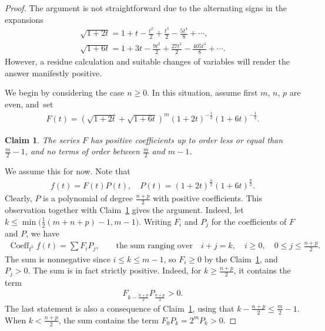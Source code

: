 \documentclass[pdftex]{sigma}
\numberwithin{equation}{section}
\newtheorem{Claim}[Theorem]{Claim}
\begin{document}
\begin{proof}
The argument is not straightforward due to the alternating signs
in the expansions
\begin{gather*}
\sqrt{1+2t}= 1+t - \frac{t^2}{2}+\frac{t^3}{2}-\frac{5t^4}{8}+\cdots,
\\
\sqrt{1+6t}=1 + 3t - \frac{9t^2}{2}+\frac{27t^3}{2} - \frac{405 t^4}{8} +\cdots.
\end{gather*}
However, a residue calculation and suitable changes of variables will render the answer manifestly positive.

We begin by considering the case $n\geq 0$. In this situation, assume first $m$, $n$, $p$ are even, and~set
\begin{gather*}
F(t)=\left(\sqrt{1+2t}+\sqrt{1+6t}\right)^m {(1+2t)}^{-\frac{1}{2}} (1+6t)^{-\frac{1}{2}}.
\end{gather*}

\begin{Claim}\label{claim}
The series $F$ has positive coefficients up to order less or equal than $\frac{m}{2}-1$, and no terms of order between $\frac{m}{2}$ and $m-1$.
\end{Claim}


We assume this for now. Note that
\begin{gather*}
f(t)=F(t) P(t), \quad P(t)=(1+2t)^{\frac{n}{2}} (1+6t)^{\frac{p}{2}}.
\end{gather*}
Clearly, $P$ is a polynomial of degree $\frac{n+p}{2}$ with positive coefficients. This observation together with Claim~\ref{claim} gives the argument. Indeed, let $k\leq \min\big(\frac{1}{2}(m+n+p)-1, m-1\big)$. Writing $F_i$ and $P_j$ for the coefficients of $F$ and $P$, we have
\begin{gather*}
\operatorname{Coeff}_{ t^k} f(t)=\sum F_iP_j, \qquad\text{the sum ranging over}\quad i+j=k, \quad i\geq 0,\quad 0\leq j\leq \frac{n+p}{2}.
\end{gather*}
The sum is nonnegative since $i\leq k\leq m-1$, so $F_i\geq 0$ by the Claim~\ref{claim}, and $P_j> 0$. The sum is in fact strictly positive. Indeed, for $k\geq \frac{n+p}{2}$, it contains the term
\begin{gather*}
F_{k-\frac{n+p}{2}} P_{\frac{n+p}{2}}>0.
\end{gather*}
The last statement is also a consequence of Claim~\ref{claim}, using that $k-\frac{n+p}{2}\leq\frac{m}{2}-1$. When $k<\frac{n+p}{2}$, the sum contains the term $F_0 P_k=2^m P_k>0$.


\end{proof}
\end{document}

